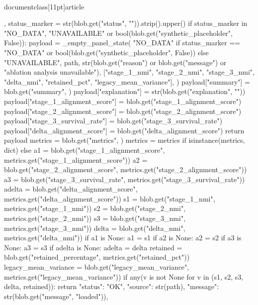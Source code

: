 \\documentclass[11pt]{article}
\begin{document}
\begin{CodeBlock}
{{{{                        }
                    },
                }
            status_marker = str(blob.get("status", "")).strip().upper()
            if status_marker in {"NO_DATA", "UNAVAILABLE"} or bool(blob.get("synthetic_placeholder", False)):
                payload = _empty_panel_state(
                    "NO_DATA" if status_marker == "NO_DATA" or bool(blob.get("synthetic_placeholder", False)) else "UNAVAILABLE",
                    path,
                    str(blob.get("reason") or blob.get("message") or "ablation analysis unavailable"),
                    ["stage_1_nmi", "stage_2_nmi", "stage_3_nmi", "delta_nmi", "retained_pct", "legacy_mean_variance"],
                )
                payload["summary"] = blob.get("summary", {})
                payload["explanation"] = str(blob.get("explanation", ""))
                payload["stage_1_alignment_score"] = blob.get("stage_1_alignment_score")
                payload["stage_2_alignment_score"] = blob.get("stage_2_alignment_score")
                payload["stage_3_survival_rate"] = blob.get("stage_3_survival_rate")
                payload["delta_alignment_score"] = blob.get("delta_alignment_score")
                return payload
            metrics = blob.get("metrics", {})
            metrics = metrics if isinstance(metrics, dict) else {}
            a1 = blob.get("stage_1_alignment_score", metrics.get("stage_1_alignment_score"))
            a2 = blob.get("stage_2_alignment_score", metrics.get("stage_2_alignment_score"))
            a3 = blob.get("stage_3_survival_rate", metrics.get("stage_3_survival_rate"))
            adelta = blob.get("delta_alignment_score", metrics.get("delta_alignment_score"))
            s1 = blob.get("stage_1_nmi", metrics.get("stage_1_nmi"))
            s2 = blob.get("stage_2_nmi", metrics.get("stage_2_nmi"))
            s3 = blob.get("stage_3_nmi", metrics.get("stage_3_nmi"))
            delta = blob.get("delta_nmi", metrics.get("delta_nmi"))
            if a1 is None:
                a1 = s1
            if a2 is None:
                a2 = s2
            if a3 is None:
                a3 = s3
            if adelta is None:
                adelta = delta
            retained = blob.get("retained_percentage", metrics.get("retained_pct"))
            legacy_mean_variance = blob.get("legacy_mean_variance", metrics.get("legacy_mean_variance"))
            if any(v is not None for v in (s1, s2, s3, delta, retained)):
                return {
                    "status": "OK",
                    "source": str(path),
                    "message": str(blob.get("message", "loaded")),
}}
\end{CodeBlock}
\end{document}
